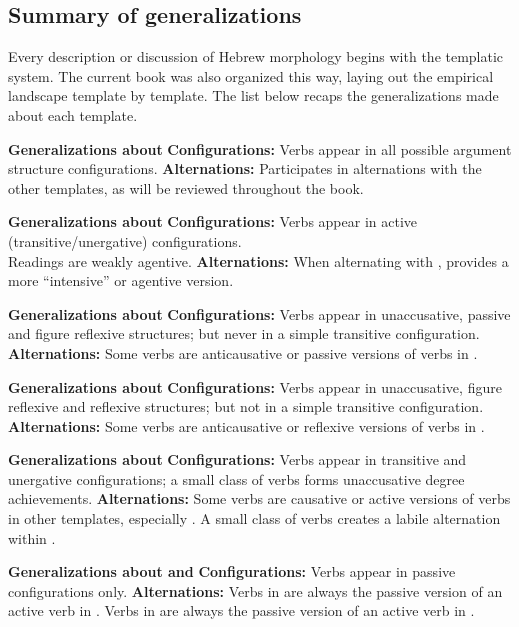 	\subsection{Summary of generalizations}
Every description or discussion of Hebrew morphology begins with the templatic system. The current book was also organized this way, laying out the empirical landscape template by template. The list below recaps the generalizations made about each template.

\pex \textbf{Generalizations about {\tkal}}
	\a \textbf{Configurations:} Verbs appear in all possible argument structure configurations.
	\a \textbf{Alternations:} Participates in alternations with the other templates, as will be reviewed throughout the book.
\xe

\pex \textbf{Generalizations about {\tpie}}
	\a \textbf{Configurations:} Verbs appear in active (transitive/unergative) configurations.\\
		Readings are weakly agentive.
	\a \textbf{Alternations:} When alternating with {\tkal}, provides a more ``intensive'' or agentive version.
\xe

\pex \textbf{Generalizations about {\tnif}}
	\a \textbf{Configurations:} Verbs appear in unaccusative, passive and figure reflexive structures; but never in a simple transitive configuration.
	\a \textbf{Alternations:} Some verbs are anticausative or passive versions of verbs in {\tkal}.
\xe

\pex \textbf{Generalizations about {\thit}}
	\a \textbf{Configurations:} Verbs appear in unaccusative, figure reflexive and reflexive structures; but not in a simple transitive configuration.
	\a \textbf{Alternations:} Some verbs are anticausative or reflexive versions of verbs in {\tpie}.
\xe

\pex \textbf{Generalizations about {\thif}}
	\a \textbf{Configurations:} Verbs appear in transitive and unergative configurations; a small class of verbs forms unaccusative degree achievements.
	\a \textbf{Alternations:} Some verbs are causative or active versions of verbs in other templates, especially {\tkal}. A small class of verbs creates a labile alternation within {\thif}.
\xe

\pex \textbf{Generalizations about {\tpua} and {\thuf}}
	\a \textbf{Configurations:} Verbs appear in passive configurations only.
	\a \textbf{Alternations:} Verbs in {\tpua} are always the passive version of an active verb in {\tpie}. Verbs in {\thuf} are always the passive version of an active verb in {\thif}.
\xe


